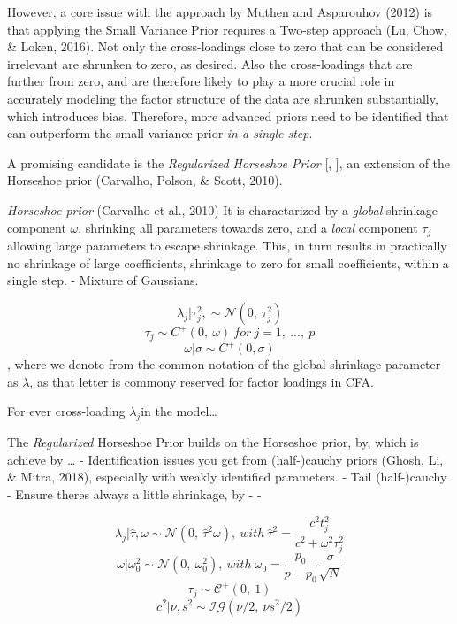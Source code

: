 \documentclass[
  english,
  man]{apa6}
\begin{document}
However, a core issue with the approach by Muthen and Asparouhov (2012) is that applying the Small Variance Prior requires a Two-step approach (Lu, Chow, \& Loken, 2016). Not only the cross-loadings close to zero that can be considered irrelevant are shrunken to zero, as desired. Also the cross-loadings that are further from zero, and are therefore likely to play a more crucial role in accurately modeling the factor structure of the data are shrunken substantially, which introduces bias. Therefore, more advanced priors need to be identified that can outperform the small-variance prior \emph{in a single step}.

A promising candidate is the \emph{Regularized Horseshoe Prior} {[}, {]}, an extension of the Horseshoe prior (Carvalho, Polson, \& Scott, 2010).

\emph{Horseshoe prior} (Carvalho et al., 2010) It is charactarized by a \emph{global} shrinkage component \(\omega\), shrinking all parameters towards zero, and a \emph{local} component \(\tau_j\) allowing large parameters to escape shrinkage. This, in turn results in practically no shrinkage of large coefficients, shrinkage to zero for small coefficients, within a single step.
- Mixture of Gaussians.

\[\lambda_j | \tau^2_j, \sim \mathcal{N}(0, \ \tau^2_j )\]
\[\tau_j \sim C^+(0, \ \omega) \ for \ j = 1, \ ..., \ p\]
\[\omega| \sigma \sim C^+(0, \sigma)\]
, where we denote from the common notation of the global shrinkage parameter as \(\lambda\), as that letter is commony reserved for factor loadings in CFA.

For ever cross-loading \(\lambda_j\)in the model\ldots{}

The \emph{Regularized} Horseshoe Prior builds on the Horseshoe prior, by, which is achieve by \ldots{}
- Identification issues you get from (half-)cauchy priors (Ghosh, Li, \& Mitra, 2018), especially with weakly identified parameters.
- Tail (half-)cauchy
- Ensure theres always a little shrinkage, by
-
-

\[\lambda_j | \hat{\tau}, \omega \sim \mathcal{N}(0, \ \hat{\tau}^2 \omega), \ with \ \hat{\tau}^2 = \frac{c^2t_j^2}{c^2 + \omega^2 \tau_j^2}\]
\[\omega | \omega_0^2 \sim \mathcal{N}(0,\  \omega_0^2), \ with \  \omega_0 = \frac{p_0}{p-p_0}\frac{\sigma}{\sqrt{N}}\]
\[\tau_j \sim \mathcal{C^+}(0, \ 1)\]
\[c^2 | \nu, s^2 \sim \mathcal{IG}(\nu/2, \  \nu s^2/2)\]
\end{document}
